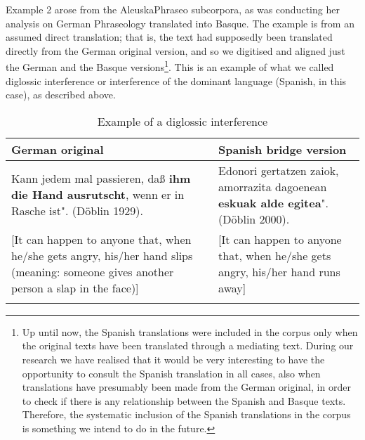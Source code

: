 \documentclass[output=paper]{LSP/langsci}
\begin{document}
Example 2 arose from the AleuskaPhraseo subcorpora, as \citet{Sanz2014} was conducting her analysis on German Phraseology translated into Basque. The example is from an assumed direct translation; that is, the text had supposedly been translated directly from the German original version, and so we digitised and aligned just the German and the Basque versions\footnote{Up until now, the Spanish translations were included in the corpus only when the original texts have been translated through a mediating text. During our research we have realised that it would be very interesting to have the opportunity to consult the Spanish translation in all cases, also when translations have presumably been made from the German original, in order to check if there is any relationship between the Spanish and Basque texts. Therefore, the systematic inclusion of the Spanish translations in the corpus is something we intend to do in the future.}. This is an example of what we called diglossic interference or interference of the dominant language (Spanish, in this case), as described above.

\begin{table}
     \centering
     \begin{tabularx}{\textwidth}{XX}
     \lsptoprule
German original    & Spanish bridge version  \\ 
\midrule
Kann jedem mal passieren, daß \textbf{ihm die Hand ausrutscht}, wenn er in Rasche ist".	(Döblin 1929).   &  Edonori gertatzen zaiok, amorrazita dagoenean \textbf{eskuak alde egitea}". (Döblin 2000).  \\ 
{[}It can happen to anyone that, when he/she gets angry, his/her hand slips (meaning: someone gives another person a slap in the face){]}  & {[}It can happen to anyone that, when he/she gets angry, his/her hand runs away{]}  \\

\lspbottomrule
\end{tabularx}

 \caption{Example of a diglossic interference}
     \label{3.4}
\end{table}     
   
\end{document}
